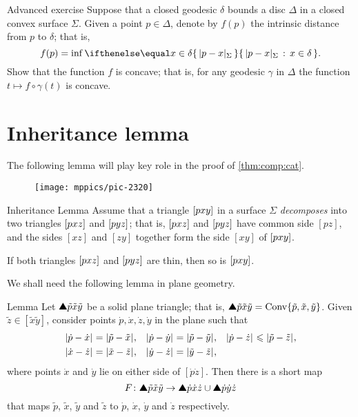 \begin{thm}{Advanced exercise}\label{ex:dist-to-bry}
Suppose that a closed geodesic $\delta$ bounds a disc $\Delta$ in a closed convex surface $\Sigma$.
Given a point $p\in\Delta$, denote by $f(p)$ the intrinsic distance from $p$ to $\delta$;
that is,
\[f(p)=\inf\set{|p-x|_\Sigma}{x\in\delta}.\]
Show that the function $f$ is concave;
that is, for any geodesic $\gamma$ in $\Delta$ the function $t\mapsto f\circ\gamma(t)$ is concave.
\end{thm}


\section{Inheritance lemma}

The following lemma will play key role in the proof of \ref{thm:comp:cat}.

\begin{wrapfigure}{r}{25mm}
\vskip-0mm
\centering
\texttt{[image: mppics/pic-2320]}
\end{wrapfigure}

\begin{thm}{Inheritance Lemma}
\label{lem:inherit-angle} 
Assume that a triangle $[p{x}{y}]$ in a surface $\Sigma$ \emph{decomposes} 
into two triangles $[p{x}{z}]$ and $[p{y}{z}]$;
that is, $[p{x}{z}]$ and $[p{y}{z}]$ have common side $[p z]$, and the sides $[x z]$ and $[z y]$ together form the side $[x y]$ of $[p{x}{y}]$.

If  both triangles $[p{x}{z}]$ and $[p{y}{z}]$ are thin, 
then so is  $[p{x}{y}]$.
\end{thm} 

We shall need the following lemma in plane geometry.


\begin{thm}{Lemma}\label{lem:quadrangle}
Let $\solidtriangle{\tilde p}{\tilde x}{\tilde y}$ be a solid plane triangle; that is, $\solidtriangle{\tilde p}{\tilde x}{\tilde y}\z=\Conv\{{\tilde p},{\tilde x},{\tilde y}\}$.
Given  $\tilde z\in[\tilde x\tilde y]$,
consider  points $\dot p, \dot x, \dot z, \dot y$ in the plane such that 
\begin{align*}
\dist{\dot p}{\dot x}{}&=\dist{\tilde p}{\tilde x}{},
&
\dist{\dot p}{\dot y}{}&=\dist{\tilde p}{\tilde y}{},
&
\dist{\dot p}{\dot z}{}&\le \dist{\tilde p}{\tilde z}{},
\\
\dist{\dot x}{\dot z}{}&=\dist{\tilde x}{\tilde z}{},
&
\dist{\dot y}{\dot z}{}&=\dist{\tilde y}{\tilde z}{},
\end{align*}
where points $\dot x$ and $\dot y$ lie on either side of $[\dot p\dot z]$.
Then there is a short map 
\[F\:\solidtriangle{\tilde p}{\tilde x}{\tilde y}\to \solidtriangle{\dot p}{\dot x}{\dot z}\cup \solidtriangle{\dot p} {\dot y} {\dot z}\]
that maps $\tilde p$, $\tilde x$, $\tilde y$ and $\tilde z$ to $\dot p$, $\dot x$, $\dot y$ and $\dot z$ respectively.
\end{thm}

